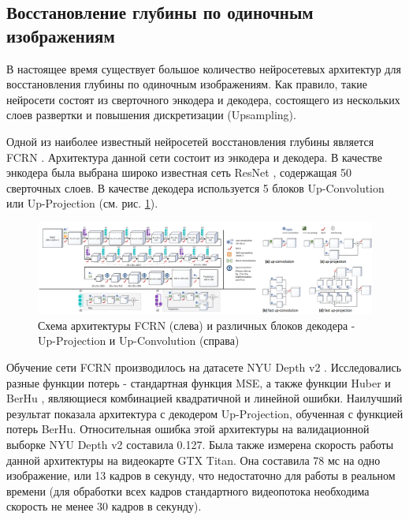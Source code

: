 \documentclass{mipt-thesis-ms}
\begin{document}
	\subsection{Восстановление глубины по одиночным изображениям}
	
	В настоящее время существует большое количество нейросетевых архитектур для восстановления глубины по одиночным изображениям. Как правило, такие нейросети состоят из сверточного энкодера и декодера, состоящего из нескольких слоев развертки и повышения дискретизации (Upsampling).
	
	Одной из наиболее известный нейросетей восстановления глубины является FCRN \cite{laina2016deeper}. Архитектура данной сети состоит из энкодера и декодера. В качестве энкодера была выбрана широко известная сеть ResNet \cite{he2016deep}, содержащая 50 сверточных слоев. В качестве декодера используется 5 блоков Up-Convolution или Up-Projection (см. рис. \ref{figure_upconv_upproj}).
	
	\begin{figure}
		\includegraphics[width=1.0\textwidth]{img/fcrn_scheme_full.png}
		\caption{Схема архитектуры FCRN (слева) и различных блоков декодера - Up-Projection и Up-Convolution (справа)}
		\label{figure_upconv_upproj}
	\end{figure}

	Обучение сети FCRN производилось на датасете NYU Depth v2 \cite{silberman2012indoor}. Исследовались разные функции потерь - стандартная функция MSE, а также функции Huber и BerHu \cite{owen2007robust} \cite{zwald2012berhu}, являющиеся комбинацией квадратичной и линейной ошибки. Наилучший результат показала архитектура с декодером Up-Projection, обученная с функцией потерь BerHu. Относительная ошибка этой архитектуры на валидационной выборке NYU Depth v2 составила 0.127. Была также измерена скорость работы данной архитектуры на видеокарте GTX Titan. Она составила 78 мс на одно изображение, или 13 кадров в секунду, что недостаточно для работы в реальном времени (для обработки всех кадров стандартного видеопотока необходима скорость не менее 30 кадров в секунду).
	
\end{document}
